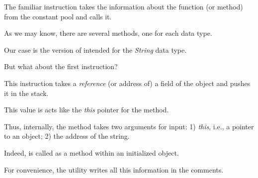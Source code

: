 The familiar  instruction takes the information about the  
function (or method) from the constant pool and calls it.

As we may know, there are several  methods, one for each data type.

Our case is the version of  intended for the \emph{String} data type.


But what about the first  instruction?

This instruction takes a \emph{reference} (or address of) a field of the object  
and pushes it in the stack.

This value is acts like the \emph{this} pointer for the  method.

Thus, internally, the  method takes two arguments for input:
1) \emph{this}, i.e., a pointer to an object; 
2) the address of the  string.


Indeed,  is called as a method within an initialized  object.


For convenience, the  utility writes all this information in the comments.

